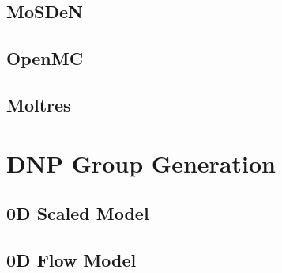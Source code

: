 
\subsection{MoSDeN}


\subsection{OpenMC}



\subsection{Moltres}
\label{sec:moltres}








\section{DNP Group Generation}
\label{sec:delnu-groupgen}


\subsection{0D Scaled Model}
\label{sec:data-model}


\subsection{0D Flow Model}
\label{sec:simple-model}


